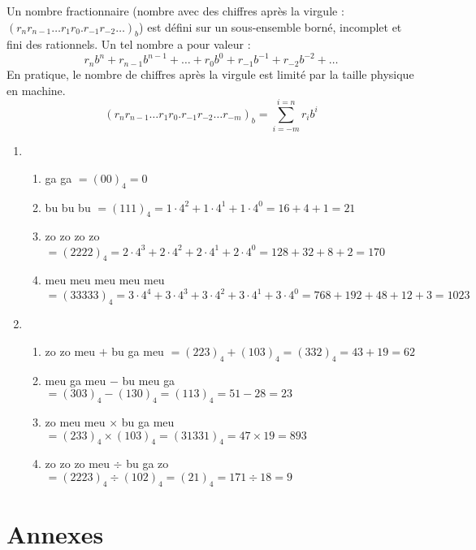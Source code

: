 \begin{description}
{\begin{rem}
	Un nombre fractionnaire (nombre avec des chiffres après la virgule :
	{$(r_nr_{n-1}\ldots r_1r_0.r_{-1}r_{-2}\ldots)_b$})
	est défini sur un sous-en\-semble borné, incomplet et fini des rationnels.
	Un tel nombre a pour valeur :
	$${r_nb^n + r_{n-1}b^{n-1} + \ldots + r_0b^0 + r_{-1}b^{-1} + r_{-2}b^{-2} + \ldots}$$
	En pratique, le nombre de chiffres après la virgule est limité par la taille physique
	en machine.
	$${(r_nr_{n-1}\ldots r_1r_0.r_{-1}r_{-2}\ldots r_{-m})_b = \sum_{i=-m}^{i=n} r_ib^i}$$
	\end{rem}}
	\begin{enumerate}
	\item   \begin{enumerate}
		\item {\sc ga} {\sc ga} 
			$= (00)_4 = 0$
		\item {\sc bu} {\sc bu} {\sc bu} 
			$= (111)_4 = 1\cdot 4^2 + 1\cdot 4^1 + 1\cdot 4^0 = 16 + 4 + 1 = 21$
		\item {\sc zo} {\sc zo} {\sc zo} {\sc zo} 
			$= (2222)_4 = 2\cdot 4^3 + 2\cdot 4^2 + 2\cdot 4^1 + 2\cdot 4^0 = 128 + 32 + 8 + 2 = 170$
		\item {\sc meu} {\sc meu} {\sc meu} {\sc meu} {\sc meu} 
			$= (33333)_4 = 3 \cdot 4^4 + 3\cdot 4^3 + 3\cdot 4^2 + 3\cdot 4^1 + 3\cdot 4^0 = 768 + 192 + 48 + 12 + 3 =
			1023$
		\end{enumerate}	
	\item	\begin{enumerate}
		\item {\sc zo} {\sc zo} {\sc meu} $+$ {\sc bu} {\sc ga} {\sc meu} 
			$= (223)_4 + (103)_4 = (332)_4 = 43 + 19 = 62$
		\item {\sc meu} {\sc ga} {\sc meu} $-$ {\sc bu} {\sc meu} {\sc ga} 
			$= (303)_4 - (130)_4 = (113)_4 = 51 - 28 = 23$
		\item {\sc zo} {\sc meu} {\sc meu} $\times$ {\sc bu} {\sc ga} {\sc meu} 
			$= (233)_4 \times (103)_4 = (31331)_4 = 47 \times 19 = 893$
		\item {\sc zo} {\sc zo} {\sc zo} {\sc meu} $\div$ {\sc bu} {\sc ga} {\sc zo} 
			$= (2223)_4 \div (102)_4 = (21)_4 = 171 \div 18 = 9$
		\end{enumerate}
	\end{enumerate}
\end{description}

\newpage
\section{Annexes}

